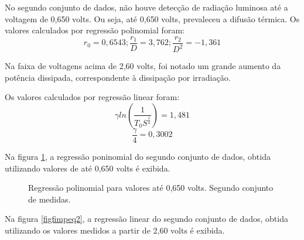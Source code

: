 \documentclass[brazilian,12pt,a4paper,final]{article}
\begin{document}
No segundo conjunto de dados, 
não houve detecção de radiação luminosa até a voltagem de 0,650 volts.
Ou seja, até 0,650 volts, prevaleceu a difusão térmica.
Os valores calculados por regressão polinomial foram:
$$r_0=0,6543; \frac{r_1}{D}=3,762; \frac{r_2}{D^2}=-1,361$$

Na faixa de voltagens acima de 2,60 volts, foi notado um grande aumento da
potência dissipada, correspondente à dissipação por irradiação.

Os valores calculados por regressão linear foram:
$$\gamma ln(\frac{1}{T_0S^\frac{1}{4}}) = 1,481$$
$$\frac{\gamma}{4}=0,3002$$

Na figura \ref{figiniciopeq2}, a regressão poninomial do segundo conjunto
de dados, obtida utilizando 
valores de até 0,650 volts é exibida.

\begin{figure}[htbp!]
  \caption{Regressão polinomial para valores até 0,650 volts. Segundo conjunto de medidas.}
  \label{figiniciopeq2}
  \centering
\end{figure}

Na figura \ref{figfimpeq2}, a regressão linear do segundo conjunto de dados, 
obtida utilizando os valores medidos a partir de 2,60 volts é exibida.
\end{document}
